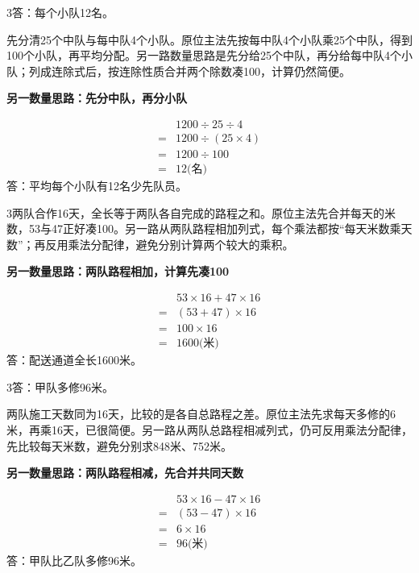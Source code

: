 \documentclass[multi=snippet,border={5bp 20bp 5bp 5bp}]{standalone}
\newenvironment{snippet}[3]{\begin{minipage}{#1bp}\color{answerred}\fontsize{#2}{#3}\selectfont\raggedright}{\end{minipage}}
\begin{document}
\begin{snippet}{505}{11.5}{14}\begin{multicols}{3}\raggedcolumns 答：每个小队12名。\par 先分清25个中队与每中队4个小队。原位主法先按每中队4个小队乘25个中队，得到100个小队，再平均分配。另一路数量思路是先分给25个中队，再分给每中队4个小队；列成连除式后，按连除性质合并两个除数凑100，计算仍然简便。\par \textbf{另一数量思路：先分中队，再分小队}\par \[\begin{aligned}&1200\div25\div4\\={}&1200\div(25\times4)\\={}&1200\div100\\={}&12\text{(名)}\end{aligned}\]答：平均每个小队有12名少先队员。\end{multicols}\end{snippet}
\begin{snippet}{505}{11.5}{14}\begin{multicols}{3}\raggedcolumns 两队合作16天，全长等于两队各自完成的路程之和。原位主法先合并每天的米数，53与47正好凑100。另一路从两队路程相加列式，每个乘法都按“每天米数乘天数”；再反用乘法分配律，避免分别计算两个较大的乘积。\par \textbf{另一数量思路：两队路程相加，计算先凑100}\par \[\begin{aligned}&53\times16+47\times16\\={}&(53+47)\times16\\={}&100\times16\\={}&1600\text{(米)}\end{aligned}\]答：配送通道全长1600米。\end{multicols}\end{snippet}
\begin{snippet}{505}{11.5}{14}\begin{multicols}{3}\raggedcolumns 答：甲队多修96米。\par 两队施工天数同为16天，比较的是各自总路程之差。原位主法先求每天多修的6米，再乘16天，已很简便。另一路从两队总路程相减列式，仍可反用乘法分配律，先比较每天米数，避免分别求848米、752米。\par \textbf{另一数量思路：两队路程相减，先合并共同天数}\par \[\begin{aligned}&53\times16-47\times16\\={}&(53-47)\times16\\={}&6\times16\\={}&96\text{(米)}\end{aligned}\]答：甲队比乙队多修96米。\end{multicols}\end{snippet}
\end{document}
